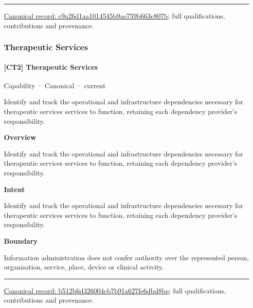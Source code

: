 \medskip\hrule\medskip

{\footnotesize \href{../../../../continuum/strategy/capability/c9a26d1aa1014545b9ae759b663c807b.md}{Canonical record: c9a26d1aa1014545b9ae759b663c807b}; full qualifications, contributions and provenance.}\par
\subsubsection{Therapeutic Services}

\paragraph{[CT2] Therapeutic Services}

\label{element:b512b6d326004cb7b91a627fe6dbd8be}
{\small Capability · Canonical · current}\par

Identify and track the operational and infrastructure dependencies necessary for therapeutic services services to function, retaining each dependency provider's responsibility.



\textbf{Overview}



Identify and track the operational and infrastructure dependencies necessary for therapeutic services services to function, retaining each dependency provider's responsibility.



\textbf{Intent}



Identify and track the operational and infrastructure dependencies necessary for therapeutic services services to function, retaining each dependency provider's responsibility.



\textbf{Boundary}



Information administration does not confer authority over the represented person, organisation, service, place, device or clinical activity.



\medskip\hrule\medskip

{\footnotesize \href{../../../../continuum/strategy/capability/b512b6d326004cb7b91a627fe6dbd8be.md}{Canonical record: b512b6d326004cb7b91a627fe6dbd8be}; full qualifications, contributions and provenance.}\par
